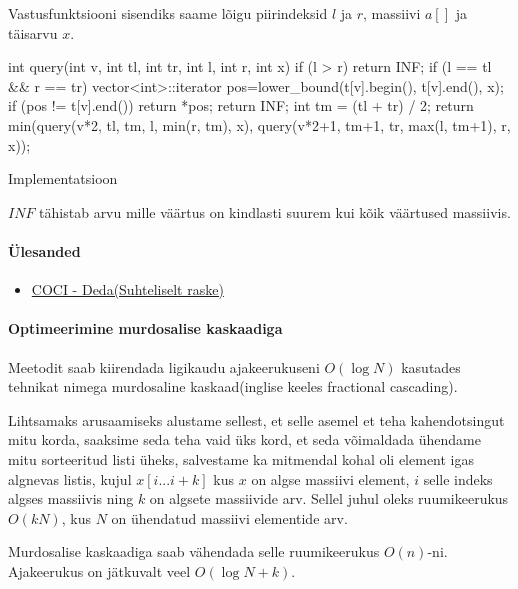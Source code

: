 \documentclass{trkut}
\begin{document}
Vastusfunktsiooni sisendiks saame lõigu piirindeksid $l$ ja $r$, massiivi $a[]$ ja täisarvu $x$.
\begin{cclol}
int query(int v, int tl, int tr, int l, int r, int x) {
if (l > r)
    return INF;
if (l == tl && r == tr) {
    vector<int>::iterator pos=lower_bound(t[v].begin(), t[v].end(), x);
    if (pos != t[v].end())
        return *pos;
    return INF;
}
int tm = (tl + tr) / 2;
return min(query(v*2, tl, tm, l, min(r, tm), x), 
            query(v*2+1, tm+1, tr, max(l, tm+1), r, x));
}
\end{cclol}
 \begin{kk}[H]%
    \caption{Implementatsioon}%
    \label{EMaxx}%
    \end{kk}
$INF$ tähistab arvu mille väärtus on kindlasti suurem kui kõik väärtused massiivis.

\paragraph{Ülesanded}
\begin{itemize}
    \item \href{https://oj.uz/problem/view/COCI17_deda}{COCI - Deda(Suhteliselt raske)}
\end{itemize}

\paragraph{Optimeerimine murdosalise kaskaadiga}

Meetodit saab kiirendada ligikaudu ajakeerukuseni $O(\log N)$ kasutades tehnikat nimega murdosaline kaskaad(inglise keeles fractional cascading).

Lihtsamaks arusaamiseks alustame sellest, et selle asemel et teha kahendotsingut mitu korda, saaksime seda teha vaid üks kord, et seda võimaldada ühendame mitu sorteeritud listi üheks, salvestame ka mitmendal kohal oli element igas algnevas listis, kujul $x[i...i+k]$ kus $x$ on algse massiivi element, $i$ selle indeks algses massiivis ning $k$ on algsete massiivide arv. Sellel juhul oleks ruumikeerukus $O(kN)$, kus $N$ on ühendatud massiivi elementide arv. \parencite{EMaxx}

Murdosalise kaskaadiga saab vähendada selle ruumikeerukus $O(n)$-ni. Ajakeerukus on jätkuvalt veel $O(\log N+k)$. \parencite{cascade}
\end{document}
